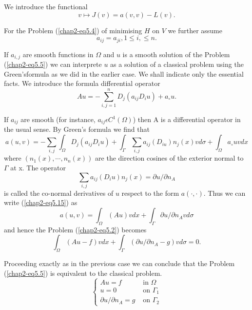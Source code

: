 We introduce the functional
$$
v \mapsto J(v) = a(v, v) - L(v).
$$

For the Problem (\ref{chap2-eq5.4}) of minimising $H$ on $V$ we further assume 
$$
a_{ij} = a_{ji} , 1 \leq i, \leq n.
$$

If $a_{i, j}$ are smooth functions in $\Omega$ and $u$ is a smooth solution of the Problem (\ref{chap2-eq5.5}) we can interprete $u$ as a solution of a classical problem using the Green's\pageoriginale formula as we did in the earlier case. We shall indicate only the essential facts. We introduce the formula differential operator
\begin{equation*}
Au = -\sum_{i, j=1}^{n} D_{j} (a_{ij} D_{i} u) + a_{\circ} u.\tag{5.14}\label{chap2-eq5.14}
\end{equation*}

If $a_{ij}$ are smooth (for instance, $a_{ij} \epsilon C^{1} (\Omega)$) then A is a differential operator in the usual sense. By Green's formula we find that
\begin{equation*}
a(u, v) = -\sum_{i, j} \int_{\Omega} D_{j} (a_{ij} D_{i}u) + \int_{\Gamma} \sum_{i, j} a_{ij} (D_{i u})n_{j} (x) v d\sigma + \int_{\Omega} a_{\circ} uv dx\tag{5.15}\label{chap2-eq5.15}
\end{equation*}
where $(n_{1}(x), \cdots , n_{n}(x))$ are the direction cosines of the exterior normal to $\Gamma$ at x. The operator
\begin{equation*}
\sum_{i, j} a_{ij} (D_{i} u) n_{j}(x) = \partial u / \partial n_{ A}\tag{5.16}\label{chap2-eq5.16}
\end{equation*}
is called the co-normal derivatives of $u$ respect to the form $a(\cdot , \cdot)$. Thus we can write (\ref{chap2-eq5.15}) as
\begin{equation*}
a(u, v) = \int_{\Omega} (Au) v dx + \int_{\Gamma} \partial u/\partial n_{A} vd\sigma\tag*{$(5.15)'$}\label{chap2-eq5.15'}
\end{equation*}
and hence the Problem (\ref{chap2-eq5.2}) becomes
$$
\int_{\Omega} (Au-f)v dx + \int_{\Gamma} (\partial u/\partial n_{A} - g) v d\sigma = 0.
$$

Proceeding exactly as in the previous case we can conclude that the Problem (\ref{chap2-eq5.5}) is equivalent to the classical problem.
\begin{equation*}
\begin{cases}
Au = f & \text{ in } \Omega\\
u = 0  & \text{ on } \Gamma_{1}\\
\partial u / \partial n_{A} = g & \text{ on } \Gamma_{2}\tag{5.17}\label{chap2-eq5.17}
\end{cases}
\end{equation*}


